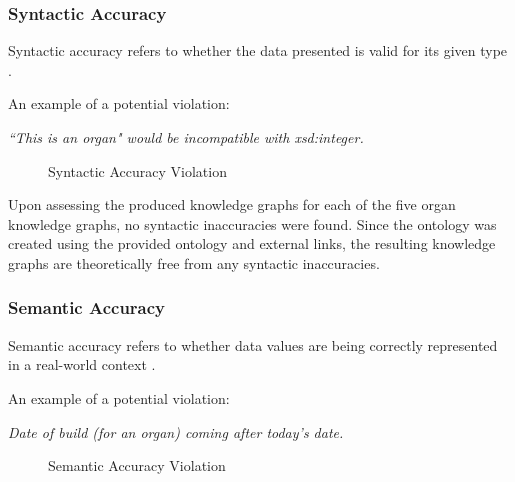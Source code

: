 \subsubsection{Syntactic Accuracy}
\hspace{0.5cm} Syntactic accuracy refers to whether the data presented is valid for its given type \cite{knowledgegraphevaulationbook}.

\noindent An example of a potential violation: 
\begin{displayquote}
    \textit{``This is an organ" would be incompatible with xsd:integer.}
\end{displayquote}

\begin{figure}[H]
\begin{center}
\end{center}
\vspace{-0.6cm}
\caption{Syntactic Accuracy Violation}
\end{figure}
\vspace{-0.15cm}

Upon assessing the produced knowledge graphs for each of the five organ knowledge graphs, no syntactic inaccuracies were found. Since the ontology was created using the provided ontology and external links, the resulting knowledge graphs are theoretically free from any syntactic inaccuracies.

\subsubsection{Semantic Accuracy}
\hspace{0.5cm} Semantic accuracy refers to whether data values are being correctly represented in a real-world context \cite{knowledgegraphevaulationbook}.

\noindent An example of a potential violation: 
\begin{displayquote}
    \textit{Date of build (for an organ) coming after today's date.}
\end{displayquote}

\begin{figure}[H]
\begin{center}
\end{center}
\vspace{-0.6cm}
\caption{Semantic Accuracy Violation}
\end{figure}
\vspace{-0.15cm}


